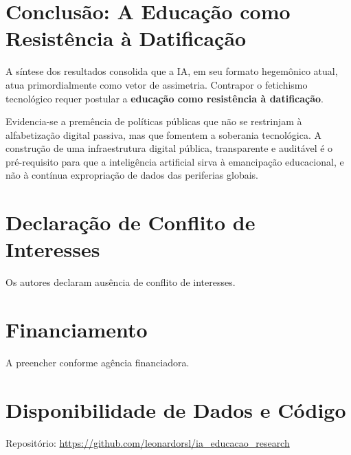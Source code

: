 \documentclass[preprint,12pt,authoryear]{elsarticle}
\begin{document}
\section{Conclusão: A Educação como Resistência à Datificação}

A síntese dos resultados consolida que a IA, em seu formato hegemônico atual, atua primordialmente 
como vetor de assimetria. Contrapor o fetichismo tecnológico requer postular a \textbf{educação como resistência à datificação}.

Evidencia-se a premência de políticas públicas que não se restrinjam à alfabetização digital passiva, 
mas que fomentem a soberania tecnológica. A construção de uma infraestrutura digital pública, transparente 
e auditável é o pré-requisito para que a inteligência artificial sirva à emancipação educacional, 
e não à contínua expropriação de dados das periferias globais.

\section*{Declaração de Conflito de Interesses}
Os autores declaram ausência de conflito de interesses.

\section*{Financiamento}
A preencher conforme agência financiadora.

\section*{Disponibilidade de Dados e Código}
Repositório: \url{https://github.com/leonardorsl/ia_educacao_research}



\end{document}
